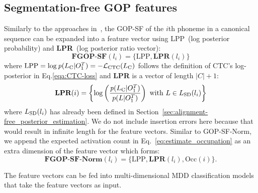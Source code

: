 \subsection{Segmentation-free GOP features}
Similarly to the approaches in~\cite{weigthed-GOP, improved_DNN, WEI2009896}, the GOP-SF of the $i$th phoneme in a canonical sequence can be expanded into a feature vector using LPP~(log posterior probability) and \textbf{LPR}~(log posterior ratio vector):
\begin{equation}
   \label{eqa:af-feature}
   \textbf{FGOP-SF}(l_i) = \{\text{LPP}, \textbf{LPR}(l_i)\} 
\end{equation}
where $\text{LPP} = \log\mathit{p}(L_{\text{C}}|O_1^T) = -\mathcal{L}_{\text{CTC}}(L_{\text{C}})$ follows the definition of CTC's log-posterior in Eq.\eqref{eqa:CTC-loss} and \textbf{LPR} is a vector of length $|C|+1$:
\begin{equation}
    \label{eqa:LPP}
    \textbf{LPR}(i) = \left\{\log\left(\frac{\mathit{p}(L_{\text{C}}|O_1^T)}{p(L | O_1^T)}\right) \text{ with } L \in L_{\text{SD}}(l_i) \right\}
\end{equation}
where $L_{\text{SD}}(l_i)$ has already been defined in Section~\ref{sec:alignment-free_posterior_estimation}.
We do not include insertion errors here because that would result in infinite length for the feature vectors.
Similar to GOP-SF-Norm, we append the expected activation count in Eq.~\ref{eq:estimate_occupation} as an extra dimension of the feature vector which forms:
\begin{equation}
   \label{eqa:af-feature}
   \textbf{FGOP-SF-Norm}(l_i) = \{\text{LPP}, \textbf{LPR}(l_i), \text{Occ}(i)\}. 
\end{equation}

The feature vectors can be fed into multi-dimensional MDD classification models that take the feature vectors as input.

